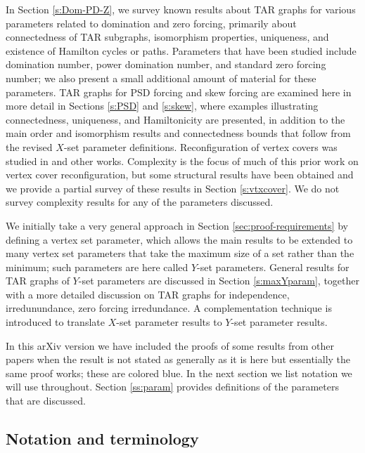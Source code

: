 \documentclass{article}
\def\blu{\color{blue}}
\numberwithin{figure}{section}
\numberwithin{table}{section}
\numberwithin{equation}{section}
\theoremstyle{definition}
\theoremstyle{definition}
\theoremstyle{definition}
\begin{document}
In Section \ref{s:Dom-PD-Z}, we survey known results about TAR graphs for various parameters  related to domination and zero forcing,  primarily about connectedness of TAR subgraphs, isomorphism properties, uniqueness, and existence of Hamilton cycles or paths.  Parameters that have been studied include domination number, power domination number, and standard zero forcing number; we also present a small additional amount of material for these parameters. 
TAR graphs for PSD forcing and  skew forcing   are examined here in more detail in Sections  \ref{s:PSD} and  \ref{s:skew},    where examples illustrating connectedness, uniqueness, and  Hamiltonicity are presented, in addition to the main order and isomorphism results and connectedness bounds  that follow from the revised $X$-set parameter  definitions.    Reconfiguration of vertex covers was studied in \cite{IDHPSUU11,INZ15} and other works.  Complexity is the focus of much of this prior work on vertex cover reconfiguration, but some structural results have been obtained and we  provide a partial survey of these results in Section \ref{s:vtxcover}.   We do not survey complexity results for any of the parameters discussed.  

We  initially take a very general approach in Section \ref{sec:proof-requirements}  by defining a vertex set parameter, which allows the main results to be extended to many vertex set parameters that take the maximum size of a set rather than the minimum; such parameters are here called $Y$-set parameters.  General results for TAR graphs of $Y$-set parameters are discussed in Section \ref{s:maxYparam}, together with a more detailed discussion on TAR graphs for independence, irredunundance,  zero forcing irredundance. A complementation technique is introduced to  translate $X$-set parameter results to $Y$-set parameter results.     


In this arXiv version we have included the proofs of some results from other papers when the result is  not stated as generally as it is here but essentially the same proof works; these are colored {\blu blue}. In the next section we list notation we will use throughout. Section \ref{ss:param} provides definitions of the parameters that are discussed.

 \subsection{Notation and terminology}\label{ss:term}
\end{document}
